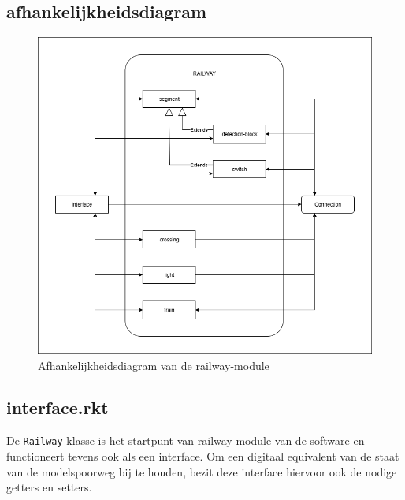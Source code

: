 \documentclass[a4paper, 11pt]{article}
\newcommand{\<}{\scriptsize\textless\normalsize}
\renewcommand{\>}{\scriptsize\textgreater\normalsize}
\begin{document}
\subsection{afhankelijkheidsdiagram} %
\begin{figure}[h]
	\begin{center}
		\includegraphics[scale=.5]{Afhankelijkheidsdiagrammen/railway.png}
		\caption{Afhankelijkheidsdiagram van de railway-module}
	\end{center}
\end{figure}

\subsection{interface.rkt} %
De \texttt{Railway} klasse is het startpunt van railway-module van de software en functioneert tevens ook als een interface. Om een digitaal equivalent van de staat van de modelspoorweg bij te houden, bezit deze interface hiervoor ook de nodige getters en setters.

\newpage
\end{document}
